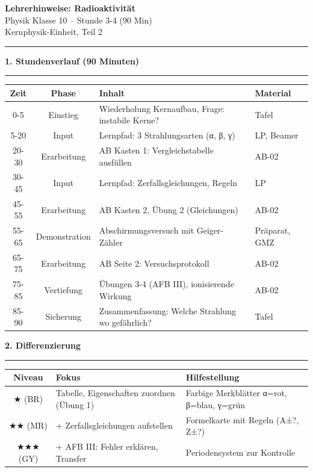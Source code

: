 \documentclass[11pt, a4paper]{article}
\newcommand{\abschnitt}[1]{%
    \vspace{10pt}\noindent\textbf{\textcolor{physik}{\large #1}}\vspace{6pt}\hrule\vspace{8pt}
}
\begin{document}
\begin{center}
{\LARGE\bfseries Lehrerhinweise: Radioaktivität}\\[6pt]
{\large Physik Klasse 10 -- Stunde 3-4 (90 Min)}\\[4pt]
{\small\textcolor{grau}{Kernphysik-Einheit, Teil 2}}
\end{center}
\vspace{8pt}\hrule\vspace{12pt}

\abschnitt{1. Stundenverlauf (90 Minuten)}

\begin{tabularx}{\textwidth}{|c|c|X|l|}
\hline
\textbf{Zeit} & \textbf{Phase} & \textbf{Inhalt} & \textbf{Material} \\
\hline
0-5 & Einstieg & Wiederholung Kernaufbau, Frage: instabile Kerne? & Tafel \\
\hline
5-20 & Input & Lernpfad: 3 Strahlungsarten (α, β, γ) & LP, Beamer \\
\hline
20-30 & Erarbeitung & AB Kasten 1: Vergleichstabelle ausfüllen & AB-02 \\
\hline
30-45 & Input & Lernpfad: Zerfallsgleichungen, Regeln & LP \\
\hline
45-55 & Erarbeitung & AB Kasten 2, Übung 2 (Gleichungen) & AB-02 \\
\hline
55-65 & Demonstration & Abschirmungsversuch mit Geiger-Zähler & Präparat, GMZ \\
\hline
65-75 & Erarbeitung & AB Seite 2: Versuchsprotokoll & AB-02 \\
\hline
75-85 & Vertiefung & Übungen 3-4 (AFB III), ionisierende Wirkung & AB-02 \\
\hline
85-90 & Sicherung & Zusammenfassung: Welche Strahlung wo gefährlich? & Tafel \\
\hline
\end{tabularx}

\vspace{12pt}

\abschnitt{2. Differenzierung}

\begin{tabularx}{\textwidth}{|c|X|X|}
\hline
\textbf{Niveau} & \textbf{Fokus} & \textbf{Hilfestellung} \\
\hline
★ (BR) & Tabelle, Eigenschaften zuordnen (Übung 1) & Farbige Merkblätter α=rot, β=blau, γ=grün \\
\hline
★★ (MR) & + Zerfallsgleichungen aufstellen & Formelkarte mit Regeln (A±?, Z±?) \\
\hline
★★★ (GY) & + AFB III: Fehler erklären, Transfer & Periodensystem zur Kontrolle \\
\hline
\end{tabularx}
\end{document}

